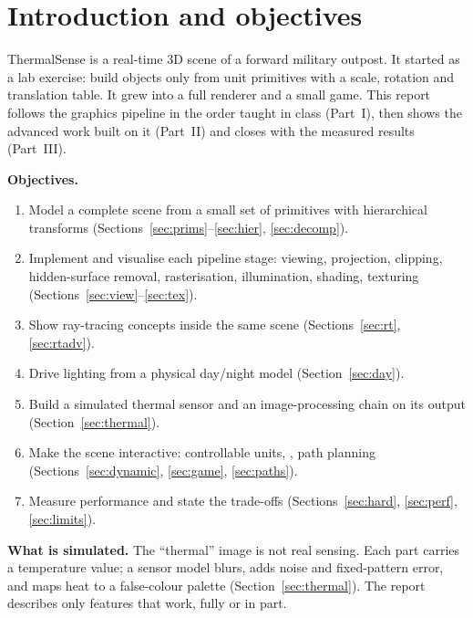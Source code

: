 \section{Introduction and objectives}
\label{sec:intro}
ThermalSense is a real-time 3D scene of a forward military outpost. It started as a lab exercise: build objects only
from unit primitives with a scale, rotation and translation table. It grew into a full renderer and a small game.
This report follows the graphics pipeline in the order taught in class \cite{hearn2011,foley1996} (Part~I), then shows the advanced work
built on it (Part~II) and closes with the measured results (Part~III).

\textbf{Objectives.}
\begin{enumerate}[label=O\arabic*.,leftmargin=2.2em]
\item Model a complete scene from a small set of primitives with hierarchical transforms (Sections~\ref{sec:prims}--\ref{sec:hier}, \ref{sec:decomp}).
\item Implement and visualise each pipeline stage: viewing, projection, clipping, hidden-surface removal, rasterisation, illumination, shading, texturing (Sections~\ref{sec:view}--\ref{sec:tex}).
\item Show ray-tracing concepts inside the same scene (Sections~\ref{sec:rt}, \ref{sec:rtadv}).
\item Drive lighting from a physical day/night model (Section~\ref{sec:day}).
\item Build a simulated thermal sensor and an image-processing chain on its output (Section~\ref{sec:thermal}).
\item Make the scene interactive: controllable units, , path planning (Sections~\ref{sec:dynamic}, \ref{sec:game}, \ref{sec:paths}).
\item Measure performance and state the trade-offs (Sections~\ref{sec:hard}, \ref{sec:perf}, \ref{sec:limits}).
\end{enumerate}

\textbf{What is simulated.} The ``thermal'' image is not real sensing. Each part carries a temperature value; a
sensor model blurs, adds noise and fixed-pattern error, and maps heat to a false-colour palette
(Section~\ref{sec:thermal}). The report describes only features that work, fully or in part.
